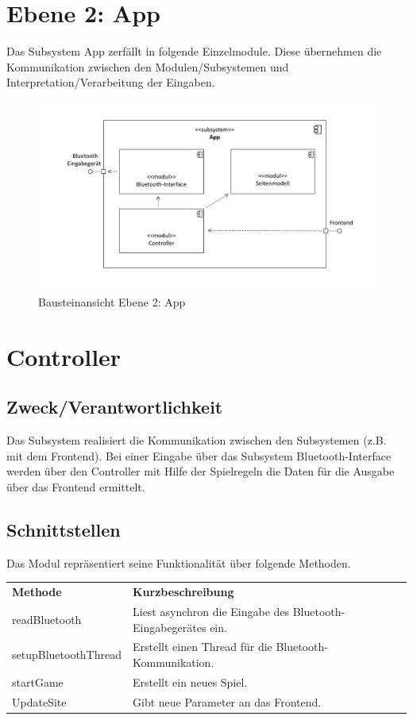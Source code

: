 \section{Ebene 2: App}
\label{sec:App}
Das Subsystem App zerfällt in folgende Einzelmodule. Diese übernehmen die Kommunikation zwischen den Modulen/Subsystemen und Interpretation/Verarbeitung der Eingaben.

\begin{figure}[h]
\begin{center}
\includegraphics[scale=0.5]{Grafiken/Baustein_2.pdf}
\caption{Bausteinansicht Ebene 2: App}
\end{center}
\end{figure}

\section{Controller}
\subsection*{Zweck/Verantwortlichkeit}
Das Subsystem realisiert die Kommunikation zwischen den Subsystemen (z.B. mit dem Frontend). Bei einer Eingabe über das Subsystem Bluetooth-Interface werden über den Controller mit Hilfe der Spielregeln die Daten für die Ausgabe über das Frontend ermittelt.
\subsection*{Schnittstellen}
Das Modul repräsentiert seine Funktionalität über folgende Methoden.
\begin{center}
\begin{tabular}[h]{|l|l|}
\cline{1-2}
\textbf{Methode} & \textbf{Kurzbeschreibung}\\
\cline{1-2}
readBluetooth & Liest asynchron die Eingabe des Bluetooth-Eingabegerätes ein.\\ 
\cline{1-2}
setupBluetoothThread & Erstellt einen Thread für die Bluetooth-Kommunikation.\\
\cline{1-2}
startGame & Erstellt ein neues Spiel.\\
\cline{1-2}
UpdateSite & Gibt neue Parameter an das Frontend.\\
\cline{1-2} 
\end{tabular}
\end{center}
